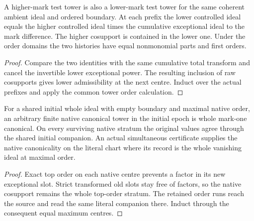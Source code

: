 \begin{theorem}
\label{hir:g8-ordered-marks-common-test-tower}
\leanok
A higher-mark test tower is also a lower-mark test tower
for the same coherent ambient ideal and ordered boundary.
At each prefix the lower controlled ideal equals the higher
controlled ideal times the cumulative exceptional ideal to
the mark difference. The higher cosupport is contained in
the lower one. Under the order domains the two histories
have equal nonmonomial parts and first orders.
\end{theorem}
\begin{proof}
Compare the two identities with the same cumulative total
transform and cancel the invertible lower exceptional power.
The resulting inclusion of raw cosupports gives lower
admissibility at the next centre. Induct over the actual
prefixes and apply the common tower order calculation.
\end{proof}

\begin{theorem}
\label{hir:g8-finite-principal-retained-epoch}
\leanok
For a shared initial whole ideal with empty boundary and
maximal native order, an arbitrary finite native canonical
tower in the initial epoch is whole mark-one canonical.
On every surviving native stratum the original values
agree through the shared initial companion. An actual
simultaneous certificate supplies the native canonicality
on the literal chart where its record is the whole
vanishing ideal at maximal order.
\end{theorem}
\begin{proof}
Exact top order on each native centre prevents a factor
in its new exceptional slot. Strict transformed old slots
stay free of factors, so the native cosupport remains the
whole top-order stratum. The retained order runs reach
the source and read the same literal companion there.
Induct through the consequent equal maximum centres.
\end{proof}


